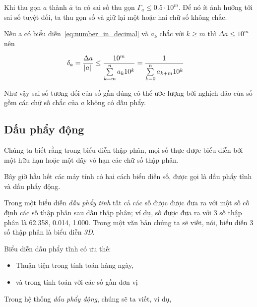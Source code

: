 \documentclass[../../Lectures.tex]{subfiles}
\begin{document}
Khi thu gọn \(a\) thành \(\overline{a}\) ta có sai số thu gọn \(\Gamma_a \leq
\num{0.5} \cdot 10^m\). Để nó ít ảnh hưởng tới sai số tuyệt đối, ta thu gọn số
và giữ lại một hoặc hai chữ số không chắc.

Nếu a có biểu diễn~\ref{eq:number_in_decimal} và \(a_k\) chắc với \(k \geq m\)
thì \(\Delta a \leq 10^m\) nên

\begin{align*}
    \delta_a = \frac{\Delta a}{\abs{a}} \leq \frac{10^m}{\sum\limits_{k=m}\limits^{n} a_k 10^k} &= \frac{1}{\sum\limits_{k=0}\limits^{n} a_{k+m} 10^k}
\end{align*}

Như vậy sai số tương đối của số gần đúng có thể ước lượng bởi nghịch đảo của số
gồm các chữ số chắc của \(a\) không có dấu phẩy.

\subsection{Dấu phẩy động}

Chúng ta biết rằng trong biểu diễn thập phân, mọi số thực được biểu diễn bởi một
hữu hạn hoặc một dãy vô hạn các chữ số thập phân.

Bây giờ hầu hết các máy tính có hai cách biểu diễn số, được gọi là dấu phẩy tĩnh
và dấu phẩy động.

Trong một biểu diễn \emph{dấu phẩy tĩnh} tất cả các số được được đưa ra với một
số cố định các số thập phân sau dấu thập phân; ví dụ, số được đưa ra với 3 số
thập phân là \num{62.358}, \num{0.014}, \num{1.000}. Trong một văn bản chúng ta
sẽ viết, nói, biểu diễn 3 số thập phân là biểu diễn \emph{3D}.

Biểu diễn dấu phẩy tĩnh có ưu thế:

\begin{itemize}
    \item Thuận tiện trong tính toán hàng ngày,
    \item và trong tính toán với các số gần đơn vị
\end{itemize}

Trong hệ thống \emph{dấu phẩy động}, chúng sẽ ta viết, ví dụ,
\end{document}
